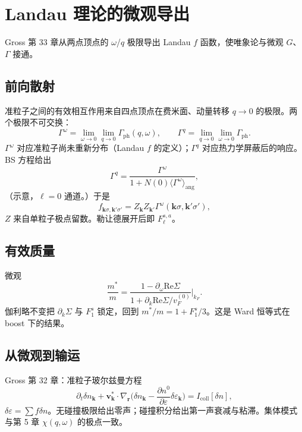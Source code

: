 \section{Landau 理论的微观导出}

Gross 第 33 章从两点顶点的 $\omega$/$q$ 极限导出 Landau $f$ 函数，使唯象论与微观 $G$、$\Gamma$ 接通。

\subsection{前向散射}

准粒子之间的有效相互作用来自四点顶点在费米面、动量转移 $q\to0$ 的极限。两个极限不可交换：
\begin{equation}
  \Gamma^\omega
  =\lim_{\omega\to0}\lim_{q\to0}\Gamma_{\mathrm{ph}}(q,\omega),
  \qquad
  \Gamma^q
  =\lim_{q\to0}\lim_{\omega\to0}\Gamma_{\mathrm{ph}}.
\end{equation}
$\Gamma^\omega$ 对应准粒子尚未重新分布（Landau $f$ 的定义）；$\Gamma^q$ 对应热力学屏蔽后的响应。BS 方程给出
\begin{equation}
  \Gamma^q
  =\frac{\Gamma^\omega}{1+N(0)\langle\Gamma^\omega\rangle_{\mathrm{ang}}},
\end{equation}
（示意，$\ell=0$ 通道。）于是
\begin{equation}
  f_{\mathbf{k}\sigma,\mathbf{k}'\sigma'}
  =Z_{\mathbf{k}}Z_{\mathbf{k}'}
  \Gamma^\omega(\mathbf{k}\sigma,\mathbf{k}'\sigma'),
\end{equation}
$Z$ 来自单粒子极点留数。勒让德展开后即 $F_\ell^{s,a}$。

\subsection{有效质量}

微观
\begin{equation}
  \frac{m^*}{m}
  =\frac{1-\partial_\omega\mathrm{Re}\Sigma}{1+\partial_k\mathrm{Re}\Sigma/v_F^{(0)}}
  \Big|_{k_F}.
\end{equation}
伽利略不变把 $\partial_k\Sigma$ 与 $F_1^s$ 锁定，回到 $m^*/m=1+F_1^s/3$。这是 Ward 恒等式在 boost 下的结果。

\subsection{从微观到输运}

Gross 第 32 章：准粒子玻尔兹曼方程
\begin{equation}
  \partial_t\delta n_{\mathbf{k}}
  +\mathbf{v}_{\mathbf{k}}^*\cdot\nabla_{\mathbf{r}}
  \bigl(\delta n_{\mathbf{k}}-\frac{\partial n^0}{\partial\varepsilon}\delta\varepsilon_{\mathbf{k}}\bigr)
  =I_{\mathrm{coll}}[\delta n],
\end{equation}
$\delta\varepsilon=\sum f\delta n$。无碰撞极限给出零声；碰撞积分给出第一声衰减与粘滞。集体模式与第 5 章 $\chi(q,\omega)$ 的极点一致。
